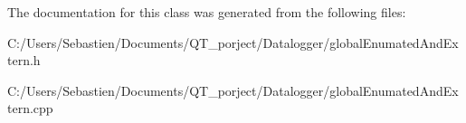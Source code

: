 The documentation for this class was generated from the following files\+:\begin{DoxyCompactItemize}
\item 
C\+:/\+Users/\+Sebastien/\+Documents/\+Q\+T\+\_\+porject/\+Datalogger/global\+Enumated\+And\+Extern.\+h\item 
C\+:/\+Users/\+Sebastien/\+Documents/\+Q\+T\+\_\+porject/\+Datalogger/global\+Enumated\+And\+Extern.\+cpp\end{DoxyCompactItemize}
